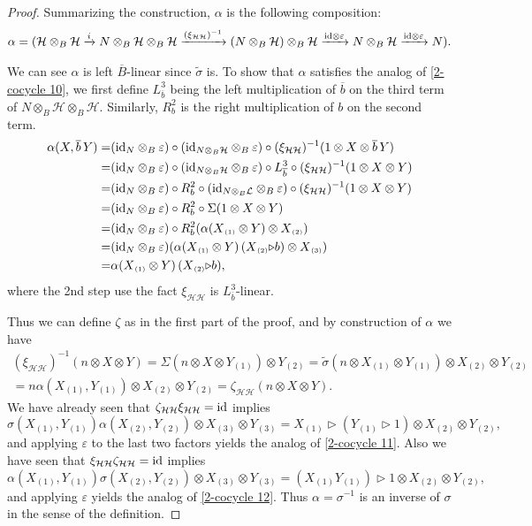 \documentclass[a4paper,reqno]{amsart}
\newcommand*{\id}{\textup{id}}
\numberwithin{equation}{section}
\theoremstyle{plain}
\theoremstyle{remark}
\numberwithin{equation}{section}
\newcommand\inv{^{-1}}
\newcommand{\ot}{\otimes}
\newcommand{\cL}{\mathcal{L}}
\newcommand{\BB}{\overline{B}}
\renewcommand{\o}{{}_{\scriptscriptstyle{(1)}}}
\renewcommand{\t}{{}_{\scriptscriptstyle{(2)}}}
\renewcommand{\th}{{}_{\scriptscriptstyle{(3)}}}
\newcommand{\la}{{\triangleright}}
\newcommand{\CH}{\mathcal{H}}
\begin{document}
\begin{proof}
    Summarizing the construction,  $\alpha$ is the following composition:
    \begin{align*}
        \alpha=(\CH\ot_{B}\CH\xrightarrow{i} N\ot_B\CH\ot_B\CH\xrightarrow{(\xi_{\CH\CH})^{-1}}(N\ot_B\CH)\ot_B\CH\xrightarrow{\id\ot \varepsilon}N\ot_B\CH\xrightarrow{\id\ot \varepsilon}N).
    \end{align*} 
    
We can see $\alpha$ is left $\BB$-linear since $\tilde{\sigma}$ is. 
To show that $\alpha$ satisfies the analog of \eqref{2-cocycle 10}, we first define $L^{3}_{\overline{b}}$ being the left multiplication of $\overline{b}$ on the third term of $N\ot_{B}\CH\ot_{B}\CH$. Similarly, $R^{2}_{b}$ is the right multiplication of $b$ on the second term. 
\begin{align*}
    \alpha(X, \overline{b}\,Y)=&(\id_{N} \ot_{B} \varepsilon)\circ (\id_{N\ot_{B}\CH}\ot_{B} \varepsilon)\circ (\xi_{\CH\CH})\inv(1\ot X\ot \overline{b}\,Y)\\
    =&(\id_{N} \ot_{B} \varepsilon)\circ (\id_{N\ot_{B}\CH}\ot_{B} \varepsilon)\circ L^{3}_{\overline{b}} \circ (\xi_{\CH\CH})\inv(1\ot X\ot Y)\\
     =&(\id_{N} \ot_{B} \varepsilon)\circ R^{2}_{b} \circ(\id_{N\ot_{B}\cL}\ot_{B} \varepsilon)\circ (\xi_{\CH\CH})\inv(1\ot X\ot Y)\\
     =&(\id_{N} \ot_{B} \varepsilon)\circ R^{2}_{b} \circ\Sigma(1\ot X\ot Y)\\
     =&(\id_{N} \ot_{B} \varepsilon)\circ R^{2}_{b} (\alpha(X\o\ot Y)\ot X\t)\\
     =&(\id_{N} \ot_{B} \varepsilon)(\alpha(X\o\ot Y)\, (X\t\la b)\ot X\th)\\
     =&\alpha(X\o\ot Y)\, (X\t\la b),
\end{align*}
where the 2nd step use the fact $\xi_{\CH\CH}$ is $L^{3}_{\overline{b}}$-linear. 

Thus we can define $\zeta$ as in the first part of the proof, and by construction of $\alpha$ we have
\begin{multline*}
    (\xi_{\CH\CH})\inv(n\ot X\ot Y)=\Sigma(n\ot X\ot Y\o)\ot Y\t
    =\tilde\sigma(n\ot X\o\ot Y\o)\ot X\t\ot Y\t
    \\=n\alpha(X\o,Y\o)\ot X\t\ot Y\t
    =\zeta_{\CH\CH}(n\ot X\ot Y).
\end{multline*}
We have already seen that $\zeta_{\CH\CH}\xi_{\CH\CH}=\id$ implies
\[\sigma(X\o,Y\o)\alpha(X\t,Y\t)\ot X\th\ot Y\th=X\o\la (Y\o\la 1)\ot X\t\ot Y\t,\]
and applying $\varepsilon$ to the last two factors yields the analog of \eqref{2-cocycle 11}. Also we have seen that $\xi_{\CH\CH}\zeta_{\CH\CH}=\id$ implies 
\[\alpha(X\o,Y\o)\sigma(X\t,Y\t)\ot X\th\ot Y\th=(X\o Y\o)\la 1\ot X\t\ot Y\t,\]
and applying $\varepsilon$ yields the analog of \eqref{2-cocycle 12}. Thus $\alpha=\sigma\inv$ is an inverse of $\sigma$ in the sense of the definition.


\end{proof}
\end{document}

